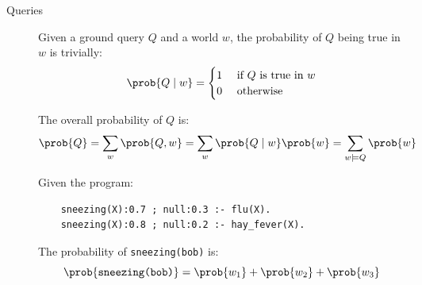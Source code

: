 \begin{description}
    \item[Queries] 
        Given a ground query $Q$ and a world $w$, the probability of $Q$ being true in $w$ is trivially:
        \[ 
            \prob{Q \mid w} =
            \begin{cases}
                1 & \text{ if $Q$ is true in $w$}\\
                0 & \text{ otherwise}
            \end{cases} 
        \]

        The overall probability of $Q$ is:
        \[ \prob{Q} = \sum_w \prob{Q, w} = \sum_w \prob{Q \mid w}\prob{w} = \sum_{w \models Q} \prob{w} \]

        \begin{example}
            Given the program:
            \begin{lstlisting}
    sneezing(X):0.7 ; null:0.3 :- flu(X).
    sneezing(X):0.8 ; null:0.2 :- hay_fever(X).
            \end{lstlisting}

            The probability of \texttt{sneezing(bob)} is:
            \[ \prob{\texttt{sneezing(bob)}} = \prob{w_1} + \prob{w_2} + \prob{w_3} \]
        \end{example}
\end{description}